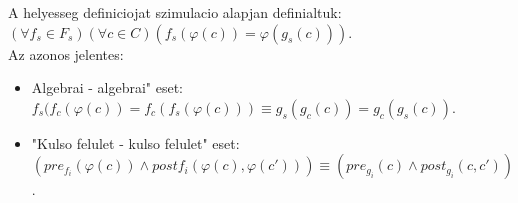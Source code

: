 \documentclass[a4paper,10pt]{article}
\begin{document}
A helyesseg definiciojat szimulacio alapjan definialtuk:\\
\indent $(\forall f_s\in F_s)(\forall c\in C)(f_s(\varphi(c)) =\varphi(g_s(c)))$.\\
Az azonos jelentes:
\begin{itemize}
\item Algebrai - algebrai" eset:\\
$f_s(f_c(\varphi(c)) = f_c(f_s(\varphi(c))) \equiv g_s(g_c(c)) = g_c(g_s(c))$.
\item "Kulso felulet - kulso felulet" eset:\\
$(pre_{f_i}(\varphi(c)) \wedge post{f_i}(\varphi(c),\varphi(c')))\equiv(pre_{g_i}(c)\wedge post_{g_i}(c,c'))$.
\end{itemize}
\end{document}
